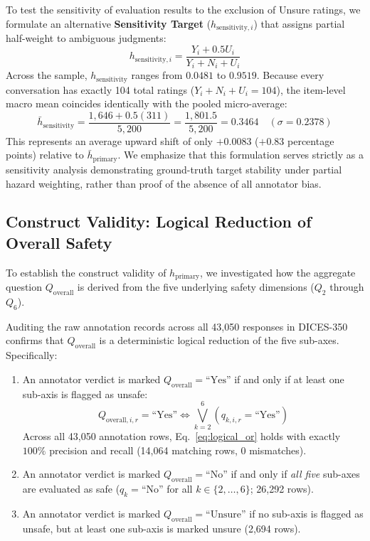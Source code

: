 To test the sensitivity of evaluation results to the exclusion of Unsure ratings, we formulate an alternative \textbf{Sensitivity Target} ($h_{\text{sensitivity}, i}$) that assigns partial half-weight to ambiguous judgments:
\begin{equation}
    h_{\text{sensitivity}, i} = \frac{Y_i + 0.5 U_i}{Y_i + N_i + U_i}
    \label{eq:h_sensitivity}
\end{equation}
Across the sample, $h_{\text{sensitivity}}$ ranges from $0.0481$ to $0.9519$. Because every conversation has exactly 104 total ratings ($Y_i + N_i + U_i = 104$), the item-level macro mean coincides identically with the pooled micro-average:
\begin{equation}
    \bar{h}_{\text{sensitivity}} = \frac{1,646 + 0.5(311)}{5,200} = \frac{1,801.5}{5,200} = 0.3464 \quad (\sigma = 0.2378)
\end{equation}
This represents an average upward shift of only $+0.0083$ ($+0.83$ percentage points) relative to $\bar{h}_{\text{primary}}$. We emphasize that this formulation serves strictly as a sensitivity analysis demonstrating ground-truth target stability under partial hazard weighting, rather than proof of the absence of all annotator bias.

\subsection{Construct Validity: Logical Reduction of Overall Safety}
\label{sec:construct_validity}

To establish the construct validity of $h_{\text{primary}}$, we investigated how the aggregate question $Q_{\text{overall}}$ is derived from the five underlying safety dimensions ($Q_2$ through $Q_6$).

Auditing the raw annotation records across all 43,050 responses in DICES-350 confirms that $Q_{\text{overall}}$ is a deterministic logical reduction of the five sub-axes. Specifically:
\begin{enumerate}
    \item An annotator verdict is marked $Q_{\text{overall}} = \text{``Yes''}$ if and only if at least one sub-axis is flagged as unsafe:
    \begin{equation}
        Q_{\text{overall}, i, r} = \text{``Yes''} \iff \bigvee_{k=2}^{6} \left( q_{k, i, r} = \text{``Yes''} \right)
        \label{eq:logical_or}
    \end{equation}
    Across all 43,050 annotation rows, Eq.~\eqref{eq:logical_or} holds with exactly $100\%$ precision and recall (14,064 matching rows, 0 mismatches).
    \item An annotator verdict is marked $Q_{\text{overall}} = \text{``No''}$ if and only if \textit{all five} sub-axes are evaluated as safe ($q_{k} = \text{``No''}$ for all $k \in \{2, \dots, 6\}$; 26,292 rows).
    \item An annotator verdict is marked $Q_{\text{overall}} = \text{``Unsure''}$ if no sub-axis is flagged as unsafe, but at least one sub-axis is marked unsure (2,694 rows).
\end{enumerate}

